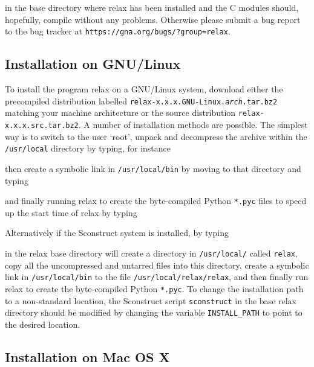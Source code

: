 
in the base directory where relax has been installed and the C modules should, hopefully, compile without any problems.  Otherwise please submit a bug report to the bug tracker at \texttt{https://gna.org/bugs/?group=relax}.



\subsection{Installation on GNU/Linux}

To install the program relax on a GNU/Linux system, download either the precompiled distribution labelled \texttt{relax-x.x.x.GNU-Linux.\textit{arch}.tar.bz2} matching your machine architecture or the source distribution \texttt{relax-x.x.x.src.tar.bz2}.  A number of installation methods are possible.  The simplest way is to switch to the user `root', unpack and decompress the archive within the \texttt{/usr/local} directory by typing, for instance


then create a symbolic link in \texttt{/usr/local/bin} by moving to that directory and typing


and finally running relax to create the byte-compiled Python \texttt{*.pyc} files to speed up the start time of relax by typing


Alternatively if the Sconstruct system is installed, by typing


in the relax base directory will create a directory in \texttt{/usr/local/} called \texttt{relax}, copy all the uncompressed and untarred files into this directory, create a symbolic link in \texttt{/usr/local/bin} to the file \texttt{/usr/local/relax/relax}, and then finally run relax to create the byte-compiled Python \texttt{*.pyc}.  To change the installation path to a non-standard location, the Sconstruct script \texttt{sconstruct} in the base relax directory should be modified by changing the variable \texttt{INSTALL\_PATH} to point to the desired location.



\subsection{Installation on Mac OS X}

